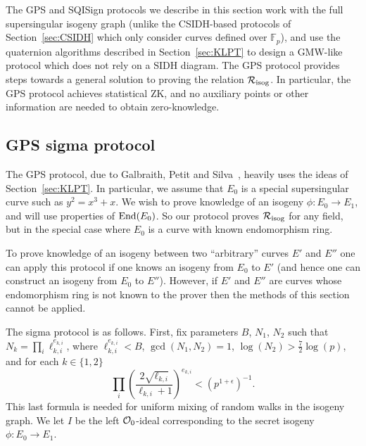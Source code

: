 The GPS and SQISign protocols we describe in this section work with the full supersingular  isogeny graph (unlike the CSIDH-based protocols of Section~\ref{sec:CSIDH} which only consider curves defined over $\mathbb{F}_p$), and use the quaternion algorithms described in Section~\ref{sec:KLPT} to design a GMW-like protocol which does not rely on a SIDH diagram. 
The GPS protocol provides steps towards a general solution to proving the relation $\R[isog]$.
In particular, the GPS protocol achieves statistical ZK, and no auxiliary points or other information are needed to obtain zero-knowledge.



\subsection{GPS sigma protocol} \label{sec:GPSproof}




The GPS protocol, due to Galbraith, Petit and Silva~\cite{GPS20},  heavily uses the ideas of Section~\ref{sec:KLPT}. In particular, we assume that $E_0$ is a special supersingular curve such as $y^2 = x^3 + x$.
We wish to prove knowledge of an isogeny $\phi : E_0 \to E_1$, and will use properties of $\End(E_0)$.
So our protocol proves $\R[isog]$ for any field, but in the special case where $E_0$ is a curve with known endomorphism ring.

To prove knowledge of an isogeny between two ``arbitrary'' curves $E'$ and $E''$ one can apply this protocol if one knows an isogeny from $E_0$ to $E'$ (and hence one can construct an isogeny from $E_0$ to $E''$).
However, if $E'$ and $E''$ are curves whose endomorphism ring is not known to the prover then the methods of this section cannot be applied.

The sigma protocol is as follows.
First, fix parameters $B$, $N_1$, $N_2$ such that $N_k =\prod_i\ell_{k,i}^{e_{k,i}}$, where $\ell_{k,i}^{e_{k,i}}<B$, $\gcd(N_1,N_2)=1$, $\log(N_2) > \tfrac{7}{2} \log(p)$, and for each $k \in \{1,2\}$
\[
  \prod_i\left(\frac{2\sqrt{\ell_{k,i}}}{\ell_{k,i}+1}\right)^{e_{k,i}}<(p^{1+\epsilon})^{-1}. 
\]
This last formula is needed for uniform mixing of random walks in the isogeny graph.
We let $I$ be the left $\OO_0$-ideal corresponding to the secret isogeny $\phi : E_0 \to E_1$.


